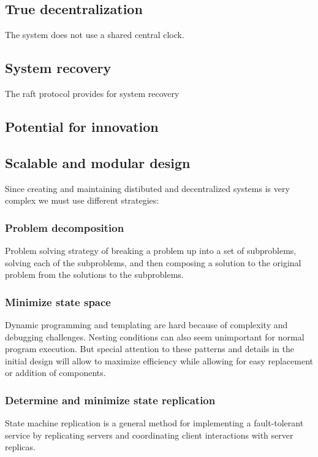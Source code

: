 \documentclass[]{article}
\begin{document}
	\subsection{True decentralization}
	The system does not use a shared central clock.
	\subsection{System recovery}
	The raft protocol provides for system recovery 
	\subsection{Potential for innovation}	
	\subsection{Scalable and modular design}
	Since creating and maintaining distibuted and decentralized systems
	is very complex we must use different strategies: 
	\subsubsection{Problem decomposition}
	Problem solving strategy of breaking a problem up into a set of subproblems, solving each of the subproblems, and then composing a solution to the original problem from the solutions to the subproblems.
	\subsubsection{Minimize state space}
	Dynamic programming and templating are hard because of complexity and debugging challenges.
	Nesting conditions can also seem unimportant for normal program execution.
	But special attention to these patterns and details in the initial design will allow to maximize efficiency while allowing for easy replacement or addition of components.   
	\subsubsection{Determine and minimize state replication}
	State machine replication is a general method for implementing a fault-tolerant service by replicating servers and coordinating client interactions with server replicas. 
\end{document}
